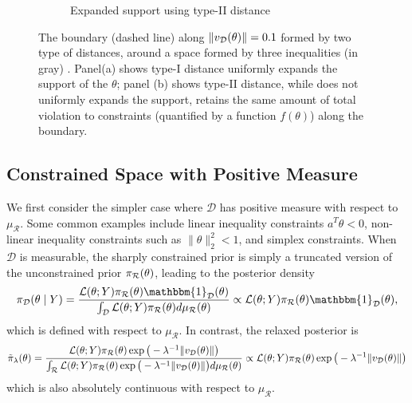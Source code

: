 \documentclass[10pt,fleqn]{article}
\DeclareMathOperator{\1}{\mathbbm{1}} \DeclareMathOperator{\bigO}{\mc O}
\begin{document}
\begin{figure}[H]
\begin{subfigure}[b]{0.45\textwidth}
{\begin{tikzpicture}[scale=3, line join=bevel]
\end{tikzpicture}}
        \caption{Expanded support using type-II distance}
    \end{subfigure}

 \caption{ The boundary (dashed line) along $\|v_{\mc D}(\theta)\| = 0.1$  formed by two type of distances, around a space formed by three inequalities (in gray) \label{fig:two_distances}. Panel(a) shows type-I distance uniformly expands
the support of the $\theta$; panel (b) shows type-II distance, while does
not uniformly expands the support, retains the same amount of total violation
 to constraints (quantified by a function $f(\theta)$) along the boundary.}
\end{figure}





\subsection{Constrained Space with Positive Measure}
\label{SEC:Positive_measure_methods}

We first consider the simpler case where $\mathcal{D}$ has positive measure with respect to $\mu_\mathcal{R}$.  Some common examples include linear inequality constraints $a^T\theta < 0$, non-linear inequality constraints such as $\|\theta\|_2^2<1$, and simplex constraints.  When $\mathcal{D}$ is measurable, the sharply constrained prior is simply a truncated version of the unconstrained prior 
$\pi_{\mc R}(\theta)$, leading to the posterior density
$$\pi_\mathcal{D}(\theta\mid Y) = \frac{\mathcal{L}(\theta; Y)
\pi_\mathcal{R}(\theta)\mathbbm{1}_\mathcal{D}(\theta)}{\int_\mathcal{D}
\mathcal{L}(\theta; Y)
\pi_\mathcal{R}(\theta)d\mu_\mathcal{R}(\theta)}\propto \mathcal{L}(\theta;
Y) \pi_\mathcal{R}(\theta)\mathbbm{1}_\mathcal{D}(\theta), $$
which is defined with respect to $\mu_\mathcal{R}$.  In contrast, the relaxed posterior is
\begin{equation}
\label{EQ:relaxedDensityPosMeasure}
\tilde{\pi}_\lambda(\theta) =
\frac{\mathcal{L}(\theta;
Y)\pi_\mathcal{R}(\theta)\exp\big(-
\lambda^{-1}{\|v_{\mc
D}(\theta)\|}\big)}{\int_{\mathcal{R}}\mathcal{L}(\theta; Y)
\pi_\mathcal{R}(\theta)\exp\big(-{\lambda^{-1}}{\|v_{\mc
D}(\theta)\|}\big)
d\mu_\mathcal{R}(\theta)} \propto
\mathcal{L}(\theta; Y)
\pi_\mathcal{R}(\theta)\exp\big(-{\lambda^{-1}}{\|v_{\mc
D}(\theta)\|}\big)
\end{equation}
which is also absolutely continuous with respect to $\mu_\mathcal{R}.$
\end{document}

